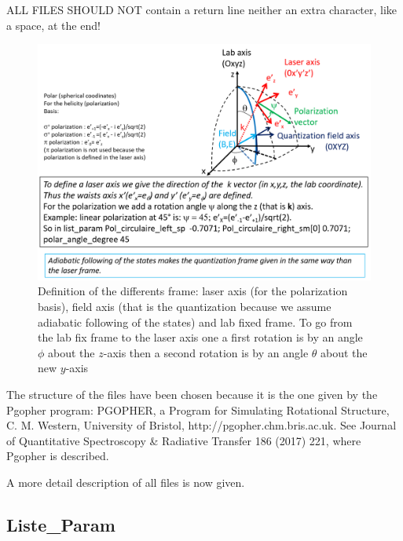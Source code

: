 \documentclass[amsmath,amssymb,nofootinbib]{revtex4-2}
\begin{document}
ALL FILES SHOULD NOT contain a return line neither an extra character, like a space, at the end!




\begin{figure}
	\centering
	\includegraphics[width=0.7\linewidth]{laser_axis_polarization}
	\caption{Definition of the differents frame: laser axis (for the polarization basis),  field axis (that is the quantization because we assume adiabatic following of the states) and lab fixed frame. 	To go from the lab fix frame to the laser axis one 	 a first rotation is by an angle $\phi$ about the $z$-axis then a second rotation is by an angle $\theta$  about the new $y$-axis
	}
	\label{fig:laseraxispolarization}
\end{figure}



The structure of the files have been chosen because it is the one given by the Pgopher program: PGOPHER, a Program for Simulating Rotational Structure, C. M. Western, University of Bristol, http://pgopher.chm.bris.ac.uk. See Journal of Quantitative Spectroscopy \& Radiative Transfer 186 (2017) 221, where Pgopher is described.

A more detail description of all files is now given.

\subsection{Liste\_Param} 
\end{document}
